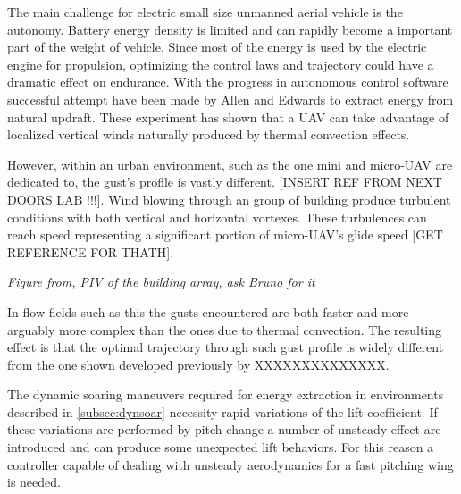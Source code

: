 
 \label{subsec:dynsoar}

\par The main challenge for electric small size unmanned aerial vehicle is the autonomy.
Battery energy density is limited and can rapidly become a important part of the weight of vehicle.
Since most of the energy is used by the electric engine for propulsion, optimizing the control laws and trajectory could have a dramatic effect on endurance. 
With the progress in autonomous control software successful attempt have been made by Allen \cite{flight_test_soaring_NASA} and Edwards \cite{flight_test_soaring_NCU} to extract energy from natural updraft.
These experiment has shown that a UAV can take advantage of localized vertical winds naturally produced by thermal convection effects.

\par However, within an urban environment, such as the one mini and micro-UAV are dedicated to, the gust's profile is vastly different. [INSERT REF FROM NEXT DOORS LAB !!!]. 
Wind blowing through an group of building produce turbulent conditions with both vertical and horizontal vortexes.
These turbulences can reach speed representing a significant portion of micro-UAV's glide speed [GET REFERENCE FOR THATH].

\par \emph{Figure from, PIV of the building array, ask Bruno for it}

\par In flow fields such as this the gusts encountered are both faster and more arguably more complex than the ones due to thermal convection.
The resulting effect is that the optimal trajectory through such gust profile is widely different from the one shown developed previously by XXXXXXXXXXXXXX.



\par The dynamic soaring maneuvers required for energy extraction in environments described in \ref{subsec:dynsoar} necessity rapid variations of the lift coefficient. 
If these variations are performed by pitch change a number of unsteady effect are introduced and can produce some unexpected lift behaviors.
For this reason a controller capable of dealing with unsteady aerodynamics for a fast pitching wing is needed.

